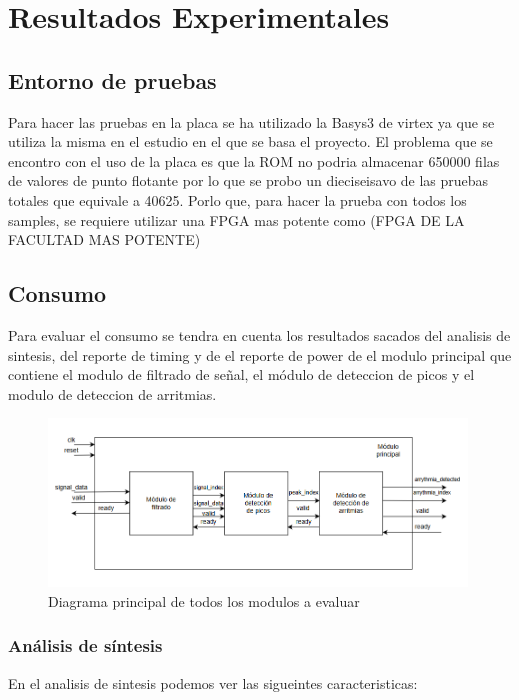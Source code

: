 \chapter{Resultados Experimentales}


\section{Entorno de pruebas}
Para hacer las pruebas en la placa se ha utilizado la Basys3 de virtex ya que se utiliza la misma en el estudio en el que se basa el proyecto.
El problema que se encontro con el uso de la placa es que la ROM no podria almacenar 650000 filas de valores de punto flotante por lo que se probo un dieciseisavo de las pruebas totales que equivale a 40625.
Porlo que, para hacer la prueba con todos los samples, se requiere utilizar una FPGA mas potente como (FPGA DE LA FACULTAD MAS POTENTE) 
\section{Consumo}
	Para evaluar el consumo se tendra en cuenta los resultados sacados del analisis de sintesis, del reporte de timing y de el reporte de power de el modulo principal que contiene el modulo de filtrado de señal,
	el módulo de deteccion de picos y el modulo de deteccion de arritmias. 
	
	\begin{figure}[h!]
		\centering
		\includegraphics[width=0.99\textwidth]{./Images/img_res_experimentales/diagramaGeneral.png}
		\caption{Diagrama principal de todos los modulos a evaluar}
		\label{fig:Diagramaasmfiltrado}
	\end{figure} 

\subsection{Análisis de síntesis}

	En el analisis de sintesis podemos ver las sigueintes caracteristicas:

